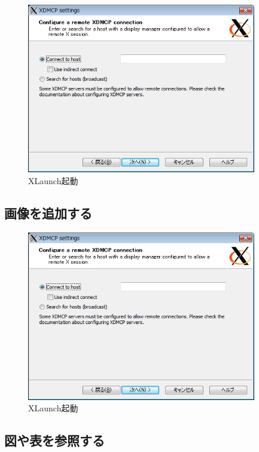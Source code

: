 \documentclass[mingoth,a4paper]{jsarticle}
\begin{document}
\begin{figure}[htbp]
 \begin{center}
  \includegraphics[width=100mm]{image200808/colinux_xlaunch_xdmcp.png}
 \end{center}
 \caption{XLaunch起動}
 \label{fig:colinux_xlaunch_xdmcp}
\end{figure}

\begin{commandline}
\subsection{画像を追加する}
\label{sec:addpicture}

\begin{figure}[htbp]
 \begin{center}
  \includegraphics[width=100mm]{image200808/colinux_xlaunch_xdmcp.png}
 \end{center}
 \caption{XLaunch起動}
 \label{fig:olinux_xlaunch_xdmcp}
\end{figure}
\end{commandline}

\subsection{図や表を参照する}
\end{document}
